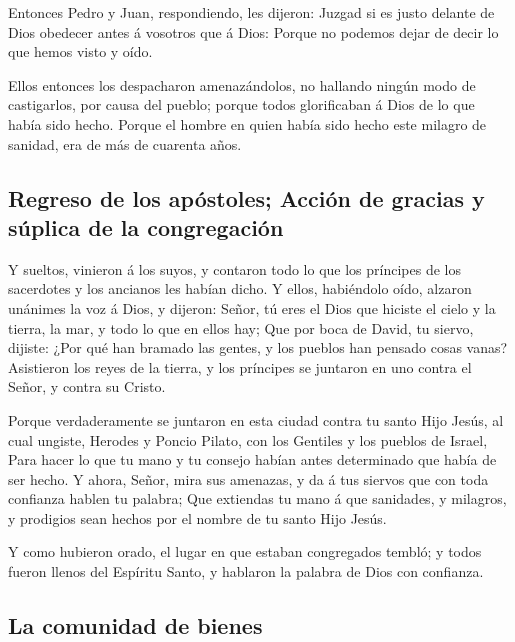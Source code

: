  Entonces Pedro y Juan, respondiendo, les dijeron: Juzgad
si es justo delante de Dios obedecer antes á vosotros que á Dios:
 Porque no podemos dejar de decir lo que hemos visto y
oído.

 Ellos entonces los despacharon amenazándolos, no hallando
ningún modo de castigarlos, por causa del pueblo; porque todos
glorificaban á Dios de lo que había sido hecho.  Porque el
hombre en quien había sido hecho este milagro de sanidad, era de más de
cuarenta años.

\hypertarget{regreso-de-los-apuxf3stoles-acciuxf3n-de-gracias-y-suxfaplica-de-la-congregaciuxf3n}{%
\subsection{Regreso de los apóstoles; Acción de gracias y súplica de la
congregación}\label{regreso-de-los-apuxf3stoles-acciuxf3n-de-gracias-y-suxfaplica-de-la-congregaciuxf3n}}

 Y sueltos, vinieron á los suyos, y contaron todo lo que
los príncipes de los sacerdotes y los ancianos les habían dicho.
 Y ellos, habiéndolo oído, alzaron unánimes la voz á Dios,
y dijeron: Señor, tú eres el Dios que hiciste el cielo y la tierra, la
mar, y todo lo que en ellos hay;  Que por boca de David, tu
siervo, dijiste: ¿Por qué han bramado las gentes, y los pueblos han
pensado cosas vanas?  Asistieron los reyes de la tierra, y
los príncipes se juntaron en uno contra el Señor, y contra su Cristo.

 Porque verdaderamente se juntaron en esta ciudad contra tu
santo Hijo Jesús, al cual ungiste, Herodes y Poncio Pilato, con los
Gentiles y los pueblos de Israel,  Para hacer lo que tu
mano y tu consejo habían antes determinado que había de ser hecho.
 Y ahora, Señor, mira sus amenazas, y da á tus siervos que
con toda confianza hablen tu palabra;  Que extiendas tu
mano á que sanidades, y milagros, y prodigios sean hechos por el nombre
de tu santo Hijo Jesús.

 Y como hubieron orado, el lugar en que estaban congregados
tembló; y todos fueron llenos del Espíritu Santo, y hablaron la palabra
de Dios con confianza.

\hypertarget{la-comunidad-de-bienes}{%
\subsection{La comunidad de bienes}\label{la-comunidad-de-bienes}}

